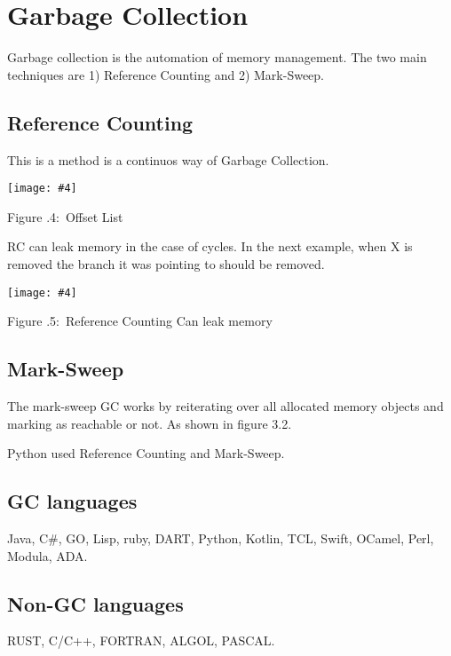\documentclass[twoside]{article}
\newcounter{lecnum}
\newcommand{\fig}[4]{
            \centerline{\texttt{[image: \#4]}}
            \begin{center}
            Figure \thelecnum.#1:~#3
            \end{center}
    }
\begin{document}
\section{Garbage Collection}
Garbage collection is the automation of memory management. The two main techniques are 1) Reference Counting and 2) Mark-Sweep.


\subsection{Reference Counting}
This is a method is a continuos way of Garbage Collection. 

\fig{4}{0.6}{Offset List}{refcounting.drawio.png}
RC can leak memory in the case of cycles. In the next example, when X is removed the branch it was pointing to should be removed. 

\fig{5}{0.6}{Reference Counting Can leak memory}{rc_leak.drawio.png}

\subsection{Mark-Sweep}
The mark-sweep GC works by reiterating over all allocated memory objects and marking as reachable or not. As shown in figure 3.2.

Python used Reference Counting and Mark-Sweep.
\subsection*{GC languages}
Java, C\#, GO, Lisp, ruby, DART, Python, Kotlin, TCL, Swift, OCamel, Perl, Modula, ADA.
\subsection*{Non-GC languages}
RUST, C/C++, FORTRAN, ALGOL, PASCAL.
\end{document}

